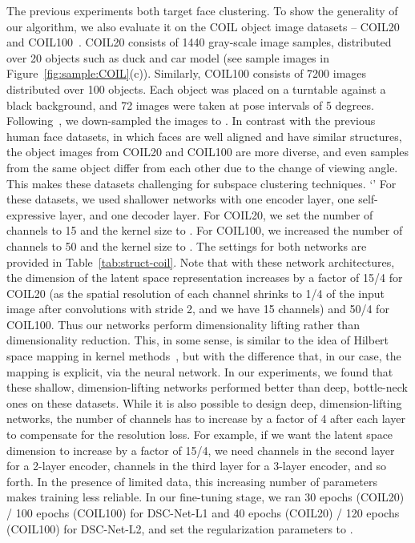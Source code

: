 \documentclass{article}
\begin{document}
The previous experiments both target face clustering. To show the generality of our algorithm, we also evaluate it on the COIL object image datasets -- COIL20~\cite{coil20} and COIL100~\cite{coil100}. COIL20 consists of 1440 gray-scale image samples, distributed over 20 objects such as duck and car model (see sample images in Figure~\ref{fig:sample:COIL}(c)). Similarly, COIL100 consists of 7200 images distributed over 100 objects. Each object was placed on a turntable against a black background, and 72 images were taken at pose intervals of 5 degrees. Following~\cite{cai2011graph}, we down-sampled the images to . In contrast with the previous human face datasets, in which faces are well aligned and have similar structures, the object images from COIL20 and COIL100 are more diverse, and even samples from the same object differ from each other due to the change of viewing angle. This makes these datasets challenging for subspace clustering techniques.
`'
For these datasets, we used shallower networks with one encoder layer, one self-expressive layer, and one decoder layer. For COIL20, we set the number of channels to 15 and the kernel size to . For COIL100, we increased the number of channels to 50 and the kernel size to . The settings for both networks are provided in Table~\ref{tab:struct-coil}. Note that with these network architectures, the dimension of the latent space representation  increases by a factor of 15/4 for COIL20 (as the spatial resolution of each channel shrinks to 1/4 of the input image after convolutions with stride 2, and we have 15 channels) and 50/4 for COIL100. Thus our networks perform dimensionality lifting rather than dimensionality reduction. This, in some sense, is similar to the idea of Hilbert space mapping in kernel methods~\cite{shawe2004kernel}, but with the difference that, in our case, the mapping is explicit, via the neural network. In our experiments, we found that these shallow, dimension-lifting networks performed better than deep, bottle-neck ones on these datasets. While it is also possible to design deep, dimension-lifting networks, the number of channels has to increase by a factor of 4 after each layer to compensate for the resolution loss. For example, if we want the latent space dimension to increase by a factor of 15/4, we need  channels in the second layer for a 2-layer encoder,  channels in the third layer for a 3-layer encoder, and so forth. In the presence of limited data, this increasing number of parameters makes training less reliable. In our fine-tuning stage, we ran 30 epochs (COIL20) / 100 epochs (COIL100) for DSC-Net-L1 and 40 epochs (COIL20) / 120 epochs (COIL100) for DSC-Net-L2, and set the regularization parameters to . 
\end{document}
